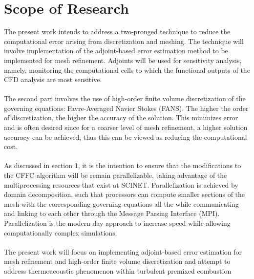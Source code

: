 \documentclass[titlepage,11pt,letterpaper]{article}
\begin{document}
\section{Scope of Research}
\noindent The present work intends to address a two-pronged technique to reduce the computational error arising from discretization and meshing. The technique will involve implementation of the adjoint-based error estimation method to be implemented for mesh refinement. Adjoints will be used for sensitivity analysis, namely, monitoring the computational cells to which the functional outputs of the CFD analysis are most sensitive.\\ \\
\noindent The second part involves the use of high-order finite volume discretization of the governing equations: Favre-Averaged Navier Stokes (FANS). The higher the order of discretization, the higher the accuracy of the solution. This minimizes error and is often desired since for a coarser level of mesh refinement, a higher solution accuracy can be achieved, thus this can be viewed as reducing the computational cost.\\ \\
\noindent As discussed in section 1, it is the intention to ensure that the modifications to the CFFC algorithm will be remain parallelizable, taking advantage of the multiprocessing resources that exist at SCINET. Parallelization is achieved by domain decomposition, such that processors can compute smaller sections of the mesh with the corresponding governing equations all the while communicating and linking to each other through the Message Parsing Interface (MPI). Parallelization is the modern-day approach to increase speed while allowing computationally complex simulations.\\ \\
\noindent The present work will focus on implementing adjoint-based error estimation for mesh refinement and high-order finite volume discretization and attempt to address thermoacoustic phenomenon within turbulent premixed combustion\\ \\




\newpage
\end{document}
